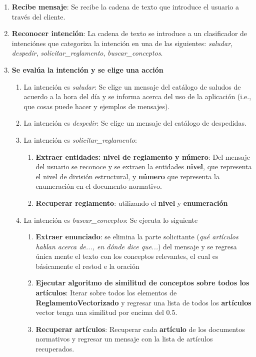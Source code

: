 \begin{enumerate}
    \item \textbf{Recibe mensaje}: Se recibe la cadena de texto que introduce el usuario a través del cliente.
    \item \textbf{Reconocer intención}: La cadena de texto se introduce a un clasificador de intenciónes que categoriza la intención en una de las siguientes: {\textit{saludar}, \textit{despedir}, \textit{solicitar\_reglamento}, \textit{buscar\_conceptos}}.
    \item \textbf{Se evalúa la intención y se elige una acción}
    
    \begin{enumerate}
        \item La intención es \textit{saludar}: Se elige un mensaje del catálogo de saludos de acuerdo a la hora del día y se informa acerca del uso de la aplicación (i.e., que cosas puede hacer y ejemplos de mensajes).
        \item La intención es \textit{despedir}: Se elige un mensaje del catálogo de despedidas.
        \item La intención es \textit{solicitar\_reglamento}: 
        
        \begin{enumerate}
            \item \textbf{Extraer entidades: nivel de reglamento y número}: Del mensaje del usuario se reconoce y se extraen la entidades \textbf{nivel}, que representa el nivel de división estructural, y \textbf{número} que representa la enumeración en el documento normativo.
            \item \textbf{Recuperar reglamento}: utilizando el \textbf{nivel} y \textbf{enumeración}
        \end{enumerate}
        
        \item La intención es \textit{buscar\_conceptos}: Se ejecuta lo siguiente
        
        \begin{enumerate}
            \item \textbf{Extraer enunciado}: se elimina la parte solicitante (\textit{qué artículos hablan acerca de..., en dónde dice que...}) del mensaje y se regresa única mente el texto con los conceptos relevantes, el cual es básicamente el restod e la oración
            \item \textbf{Ejecutar algoritmo de similitud de conceptos sobre todos los artículos}: Iterar sobre todos los elementos de \textbf{ReglamentoVectorizado} y regresar una lista de todos los \textbf{artículos} vector tenga una similitud por encima del 0.5.
            \item \textbf{Recuperar artículos}: Recuperar cada \textbf{artículo} de los documentos normativos y regresar un mensaje con la lista de artículos recuperados.
        \end{enumerate}
        

\end{enumerate}
\end{enumerate}
